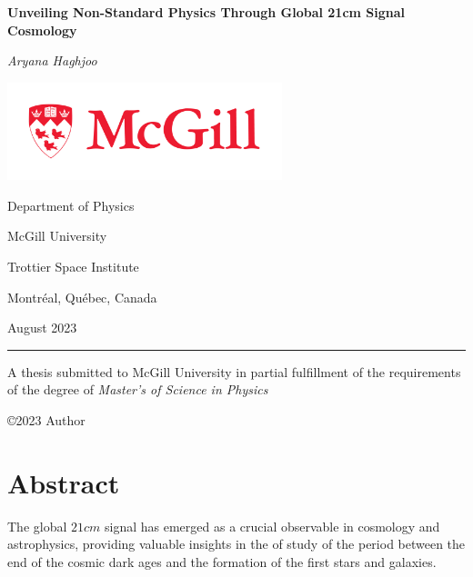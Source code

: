 \documentclass[12pt, TexShade, letterpaper]{report}
\author{\textcopyright Author, August, 2020}
\date{}
\renewcommand{\chaptermark}[1]{\markboth{#1}{}} %
\begin{document}
\begin{titlepage}
		\begin{center}
			\vspace*{0.5cm}

			\LARGE
			\textbf{Unveiling Non-Standard Physics Through Global 21cm Signal Cosmology}
			\vspace{0.5cm}
			
			\textit{Aryana Haghjoo}
			
			\vspace{0.5cm}
			
			\includegraphics[width=0.6\textwidth]{McGill_logo.png}
			
			\vspace{0.1cm}
			
			\Large
			Department of Physics
			
			\vspace{-5mm}
			McGill University
			
			\vspace{-5mm}
			Trottier Space Institute
			
			\vspace{-5mm}
			Montr\'eal, Qu\'ebec, Canada
			
			\vspace{5mm}
			August 2023
			\small
			\vspace{0.5cm}
			{\color{red} \hrule height 0.75mm}
			
			\vspace{0.2cm}
			
			A thesis submitted to McGill University in partial fulfillment of the requirements of the degree of
			\emph{Master's of Science in Physics}
		
			\copyright\hspace{0.5mm}2023 Author
			
		\end{center}
	\end{titlepage}
\setlength{\voffset}{2cm}
\renewcommand{\chaptermark}[1]{%
	\markboth{\thechapter.\ #1}{}}
\chapter*{Abstract}
	\label{chap:engAbstract}
The global $21cm$ signal has emerged as a crucial observable in cosmology and astrophysics, providing valuable insights in the of study of the period between the end of the cosmic dark ages and the formation of the first stars and galaxies.\par
\end{document}
